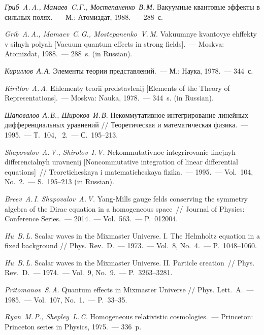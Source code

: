 \documentclass{crm-article}
\begin{document}
\begin{thebibliography}{99}
 {\it Гриб~A.\,A., Мамаев~C.\,Г.,
    Мостепаненко~В.\,М.} Вакуумные квантовые эффекты в сильных
    полях.~--- М.: Атомиздат, 1988.~--- 288~с.
\\
{\footnotesize{\it Grib~A.\,A.,
    Mamaev~C.\,G., Mostepanenko~V.\,M.} Vakuumnye kvantovye ehffekty
    v silnyh polyah [Vacuum quantum effects in strong fields].~--- Moskva: Atomizdat, 1988.~--- 288~s. (in Russian).\par}

 {\it Кириллов~А.\,А.} Элементы теории
    представлений.~--- М.: Наука, 1978.~--- 344~с.
\\
{\footnotesize{\it Kirillov~A.\,A.} Ehlementy
    teorii predstavlenij [Elements of the Theory of Representations].~--- Moskva: Nauka, 1978.~--- 344~s. (in Russian).\par}

 {\it Шаповалов~А.\,В.,
    Широков~И.\,В.} Некоммутативное интегрирование линейных
    дифференциальных уравнений  // Теоретическая и математическая
    физика.~--- 1995.~--- Т.~104, \No~2.~--- С.~195--213.
\\
{\footnotesize{\it Shapovalov~A.\,V.,
    Shirolov~I.\,V.} Nekommutativnoe integrirovanie linejnyh
    differencialnyh uravnenij [Noncommutative integration of linear
    differential equations]~// Teoreticheskaya i matematicheskaya
    fizika.~--- 1995.~--- Vol.~104, No.~2.~--- S.~195--213 (in Russian).\par}


 {\it Breev~A.\,I. Shapovalov~A.\,V.}
    Yang-Mills gauge felds conserving the symmetry algebra of the
    Dirac equation in a homogeneous space~// Journal of Physics:
    Conference Series.~--- 2014.~--- Vol.~563.~--- P.~012004.

 {\it Hu~B.\,L.} Scalar waves in the Mixmaster
    Universe. I. The Helmholtz equation in a fixed background //
    Phys. Rev.~D.~--- 1973.~--- Vol.~{8}, No.~4.~--- P.~1048--1060.

 {\it Hu~B.\,L.} Scalar waves in the Mixmaster
    Universe. II. Particle creation~// Phys. Rev.~D.~--- 1974.~--- Vol.~9,
No.~9.~--- P.~3263--3281.

 {\it Pritomanov~S.\,A.} Quantum
    effects in Mixmaster Universe // Phys. Lett.~A.~--- 1985.~--- Vol.~107,
No.~1.~--- P.~33--35.

 {\it Ryan~M.\,P., Shepley~L.\,C.}
    Homogeneous relativistic cosmologies.~--- Princeton: Princeton
    series in Physics, 1975.~--- 336~p.


\end{thebibliography}
\end{document}
